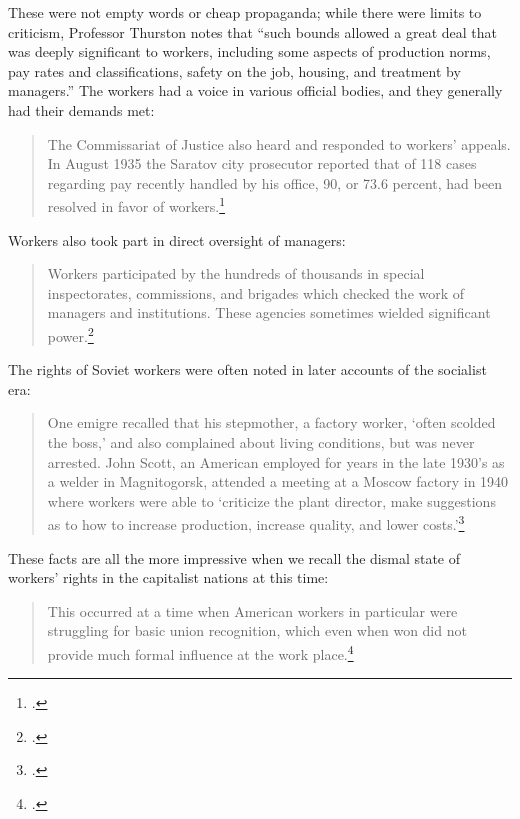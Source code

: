 These were not empty words or cheap propaganda; while there were limits
to criticism, Professor Thurston notes that ``such bounds allowed a
great deal that was deeply significant to workers, including some
aspects of production norms, pay rates and classifications, safety on
the job, housing, and treatment by managers.'' The workers had a voice
in various official bodies, and they generally had their demands met:

\begin{quote}
The Commissariat of Justice also heard and responded to workers'
appeals. In August 1935 the Saratov city prosecutor reported that of 118
cases regarding pay recently handled by his office, 90, or 73.6 percent,
  had been resolved in favor of workers.\footcite{thurston2002reassessing}
\end{quote}

Workers also took part in direct oversight of managers:

\begin{quote}
Workers participated by the hundreds of thousands in special
inspectorates, commissions, and brigades which checked the work of
managers and institutions. These agencies sometimes wielded significant
  power.\footcite{thurston2002reassessing}
\end{quote}

The rights of Soviet workers were often noted in later accounts of the
socialist era:

\begin{quote}
One emigre recalled that his stepmother, a factory worker, `often
scolded the boss,' and also complained about living conditions, but was
never arrested. John Scott, an American employed for years in the late
1930's as a welder in Magnitogorsk, attended a meeting at a Moscow
factory in 1940 where workers were able to `criticize the plant
director, make suggestions as to how to increase production, increase
  quality, and lower costs.'\footcite{thurston2002reassessing}
\end{quote}

These facts are all the more impressive when we recall the dismal state
of workers' rights in the capitalist nations at this time:

\begin{quote}
This occurred at a time when American workers in particular were
struggling for basic union recognition, which even when won did not
  provide much formal influence at the work place.\footcite{thurston2002reassessing}
\end{quote}

